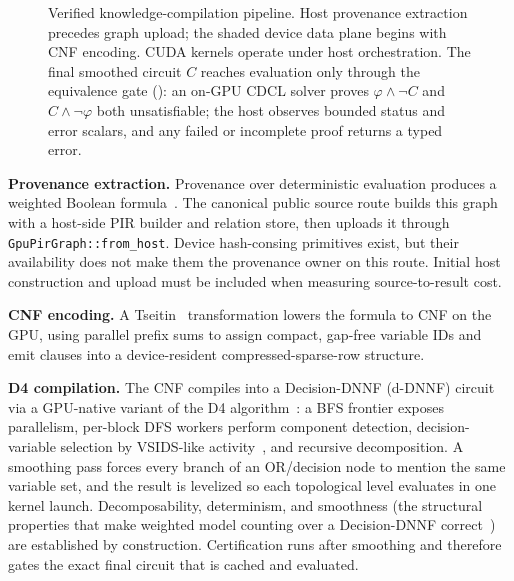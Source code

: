 \begin{figure}[tbp]
  \caption{Verified knowledge-compilation pipeline. Host provenance extraction
  precedes graph upload; the shaded device data plane begins with CNF encoding.
  CUDA kernels operate under host orchestration. The final smoothed
  circuit $C$ reaches evaluation only through the equivalence gate (\checkmark):
  an on-GPU CDCL solver proves $\varphi\wedge\lnot C$ and
  $C\wedge\lnot\varphi$ both unsatisfiable; the host observes bounded status and
  error scalars, and any failed or incomplete proof returns a typed error.}
  \label{fig:kc}
\end{figure}

\textbf{Provenance extraction.} Provenance over deterministic evaluation produces a weighted Boolean formula~\cite{green2007provenance}. The canonical public source route builds this graph with a host-side PIR builder and relation store, then uploads it through \texttt{GpuPirGraph::from\_host}. Device hash-consing primitives exist, but their availability does not make them the provenance owner on this route. Initial host construction and upload must be included when measuring source-to-result cost.

\textbf{CNF encoding.} A Tseitin~\cite{tseitin} transformation lowers the formula to CNF on the GPU, using parallel prefix sums to assign compact, gap-free variable IDs and emit clauses into a device-resident compressed-sparse-row structure.

\textbf{D4 compilation.} The CNF compiles into a Decision-DNNF (d-DNNF) circuit~\cite{darwiche2001dnnf} via a GPU-native variant of the D4 algorithm~\cite{d4compiler}: a BFS frontier exposes parallelism, per-block DFS workers perform component detection, decision-variable selection by VSIDS-like activity~\cite{chaff}, and recursive decomposition. A smoothing pass forces every branch of an OR/decision node to mention the same variable set, and the result is levelized so each topological level evaluates in one kernel launch. Decomposability, determinism, and smoothness (the structural properties that make weighted model counting over a Decision-DNNF correct~\cite{darwicheMarquis2002,chaviraDarwiche2008}) are established by construction. Certification runs after smoothing and therefore gates the exact final circuit that is cached and evaluated.

